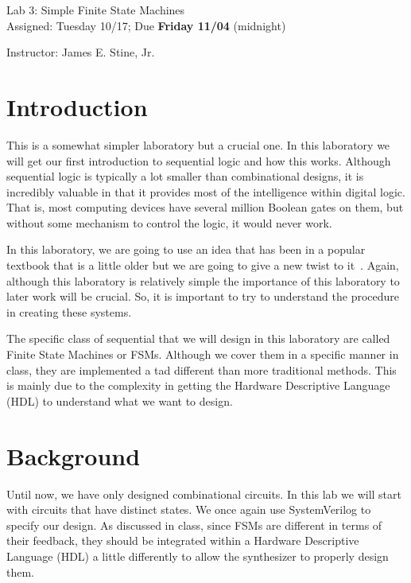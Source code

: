 \documentclass{article}
\newcommand{\myassignment}{Lab 3: Simple Finite State Machines}
\newcommand{\myduedate}{Assigned: Tuesday 10/17; Due \textbf{Friday 11/04} (midnight)}
\newcommand{\myinstructor}{Instructor: James E. Stine, Jr.}
\begin{document}
\begin{center}
  {\huge \myassignment} \\
  {\large \myduedate} \\
  \begin{flushright}
  \myinstructor \\
  \end{flushright}
\end{center}

\section{Introduction}

This is a somewhat simpler laboratory but a crucial one.  In this
laboratory we will get our first introduction to sequential logic and
how this works.  Although sequential logic is typically a lot smaller
than combinational designs, it is incredibly valuable in that it
provides most of the intelligence within digital logic.  That is, most
computing devices have several million Boolean gates on them, but
without some mechanism to control the logic, it would never work.

In this laboratory, we are going to use an idea that has been in a
popular textbook that is a little older but we are going to give a new
twist to it~\cite{DBLP:books/daglib/0067158}.  Again, although this
laboratory is relatively simple the importance of this laboratory to
later work will be crucial.  So, it is important to try to
understand the procedure in creating these systems.

The specific class of sequential that we will design in this
laboratory are called Finite State Machines or FSMs.  Although we cover them
in a specific manner in class, they are implemented a tad different
than more traditional methods.  This is mainly due to the complexity
in getting the Hardware Descriptive Language (HDL) to understand what
we want to design.

\section{Background}

Until now, we have only designed combinational circuits. In this lab
we will start with circuits that have distinct states. We once again use
SystemVerilog to specify our design.  As discussed in class, since
FSMs are different in terms of their feedback, they should be
integrated within a Hardware Descriptive Language (HDL) a little
differently to allow the synthesizer to properly design them.
\end{document}
